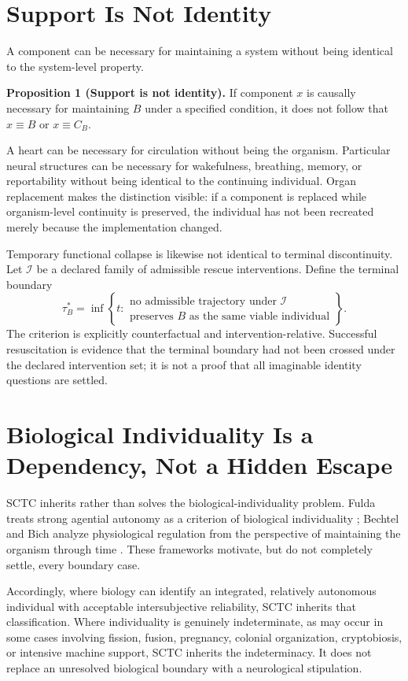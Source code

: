 \section{Support Is Not Identity}
A component can be necessary for maintaining a system without being identical to the system-level property.

\textbf{Proposition 1 (Support is not identity).} If component $x$ is causally necessary for maintaining $B$ under a specified condition, it does not follow that $x\equiv B$ or $x\equiv C_B$.

A heart can be necessary for circulation without being the organism. Particular neural structures can be necessary for wakefulness, breathing, memory, or reportability without being identical to the continuing individual. Organ replacement makes the distinction visible: if a component is replaced while organism-level continuity is preserved, the individual has not been recreated merely because the implementation changed.

Temporary functional collapse is likewise not identical to terminal discontinuity. Let $\mathcal I$ be a declared family of admissible rescue interventions. Define the terminal boundary
\begin{equation}
\tau_B^*=\inf\left\{t:\substack{\text{no admissible trajectory under }\mathcal I\\
\text{preserves }B\text{ as the same viable individual}}\right\}.
\end{equation}
The criterion is explicitly counterfactual and intervention-relative. Successful resuscitation is evidence that the terminal boundary had not been crossed under the declared intervention set; it is not a proof that all imaginable identity questions are settled.

\section{Biological Individuality Is a Dependency, Not a Hidden Escape}
SCTC inherits rather than solves the biological-individuality problem. Fulda treats strong agential autonomy as a criterion of biological individuality \cite{Fulda2023}; Bechtel and Bich analyze physiological regulation from the perspective of maintaining the organism through time \cite{BechtelBich2024}. These frameworks motivate, but do not completely settle, every boundary case.

Accordingly, where biology can identify an integrated, relatively autonomous individual with acceptable intersubjective reliability, SCTC inherits that classification. Where individuality is genuinely indeterminate, as may occur in some cases involving fission, fusion, pregnancy, colonial organization, cryptobiosis, or intensive machine support, SCTC inherits the indeterminacy. It does not replace an unresolved biological boundary with a neurological stipulation.

